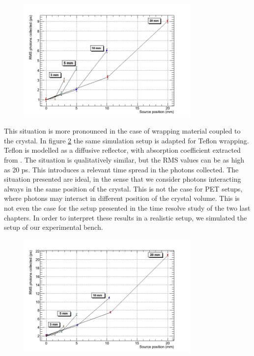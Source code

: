 \begin{figure}[htbp]
\begin{center}
\includegraphics[width=9cm]{../Pictures/Chapter_6/rms_moving.png}
\end{center}
\caption[]{}
\label{fig:rms_moving}
\end{figure}

This situation is more pronounced in the case of wrapping material coupled to the crystal. In figure \ref{fig:rms_moving_wrap} the same simulation setup is adapted for Teflon wrapping. Teflon is modelled as a diffusive reflector, with absorption coefficient extracted from \cite{Kawamura1996}. The situation is qualitatively similar, but the RMS values can be as high as 20 ps. This introduces a relevant time spread in the photons collected.
The situation presented are ideal, in the sense that we consider photons interacting always in the same position of the crystal. This is not the case for PET setups, where photons may interact in different position of the crystal volume. This is not even the case for the setup presented in the time resolve study of the two last chapters. In order to interpret these results in a realistic setup, we simulated the setup of our experimental bench.

\begin{figure}[htbp]
\begin{center}
\includegraphics[width=9cm]{../Pictures/Chapter_6/rms_moving_wrap.png}
\end{center}
\caption[]{}
\label{fig:rms_moving_wrap}
\end{figure}

